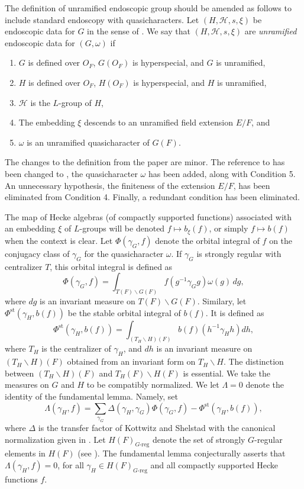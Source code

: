 \documentclass{amsart}
\begin{document}
The definition of unramified endoscopic group should be
amended as follows to include standard endoscopy with
quasicharacters.  Let $(H,{\mathcal H},s,\xi)$ be endoscopic
data for $G$ in the sense of \cite{KS1}.  We say that
$(H,{\mathcal H},s,\xi)$ are {\it unramified} endoscopic data
for $(G,\omega)$ if
\begin{enumerate}[label=(\arabic*)]
  \item $G$ is defined over $O_F$, $G(O_F)$ is hyperspecial,
and $G$ is unramified,

\item $H$ is defined over $O_F$, $H(O_F)$ is hyperspecial,
and $H$ is unramified,

\item ${\mathcal H}$ is the $L$-group of $H$,

\item The embedding $\xi$ descends to an unramified
field extension $E/F$, and

\item  $\omega$ is an unramified quasicharacter of
$G(F)$.
\end{enumerate}

The changes to the definition from the paper \cite{H2}
are minor.  The reference to \cite{LS1} has been changed
to \cite{KS1}, the quasicharacter $\omega$ has been added,
along with Condition 5.  
An unnecessary hypothesis,
 the finiteness of the extension $E/F$, has been
eliminated from Condition 4.
Finally, a redundant condition 
\cite{H2,6-Condition 4} has been eliminated.

The map of Hecke algebras (of compactly supported functions) 
associated with an embedding $\xi$
of $L$-groups will be denoted $f\mapsto b_\xi(f)$, or simply
$f\mapsto b(f)$ when the context is clear.
Let $\Phi(\gamma_G,f)$ denote the orbital integral of $f$
on the conjugacy class of $\gamma_G$ for the
quasicharacter $\omega$.  If $\gamma_G$ is strongly regular
with centralizer $T$, this orbital integral is defined
as 
$$\Phi(\gamma_G,f) = \int_{T(F)\backslash G(F)}
   f(g^{-1}\gamma_G g)\omega(g)\,dg,$$
where $dg$ is an invariant measure on $T(F)\backslash G(F)$.
Similary, let $\Phi^{\text{st}}(\gamma_H,b(f))$ be
the stable orbital integral of $b(f)$. It is 
defined as
$$\Phi^{\text{st}}(\gamma_H,b(f)) =
\int_{(T_H\backslash H)(F)} b(f)(h^{-1}\gamma_H h) dh,$$
where $T_H$ is the centralizer of $\gamma_H$, and
$dh$ is an invariant measure on $(T_H\backslash H)(F)$
obtained from an invariant form on $T_H\backslash H$.
The distinction between $(T_H\backslash H)(F)$ and
$T_H(F)\backslash H(F)$ is essential.
We take the measures on $G$ and $H$ to be compatibly normalized.
We let $\Lambda=0$
denote the identity of the fundamental lemma.  Namely, set
$$\Lambda(\gamma_H,f) = \sum_{\gamma_G}\Delta(\gamma_H,\gamma_G)\Phi(\gamma_G,f)
 - \Phi^{\text{st}}(\gamma_H,b(f)),$$
 where $\Delta$ is the transfer factor of Kottwitz and Shelstad with
 the canonical normalization given in \cite{H2,7}.  
 Let $H(F)_{G\text{-reg}}$ denote the set of strongly $G$-regular
 elements in $H(F)$ (see \cite{LS1}).  The fundamental
 lemma conjecturally asserts that $\Lambda(\gamma_H,f) = 0$,
 for all $\gamma_H\in H(F)_{G\text{-reg}}$ and all compactly supported
 Hecke functions $f$.  
\end{document}
